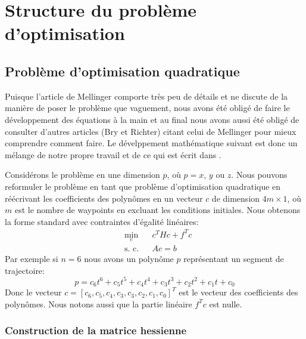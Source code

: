 \section{Structure du problème d'optimisation}

\subsection{Problème d'optimisation quadratique}

Puisque l'article de Mellinger comporte très peu de détails et ne discute de la manière de poser le problème que vaguement, nous avons été obligé de faire le développement des équations à la main et au final nous avons aussi été obligé de consulter d'autres articles (Bry et Richter) citant celui de Mellinger pour mieux comprendre comment faire. Le dévelppement mathématique suivant est donc un mélange de notre propre travail et de ce qui est écrit dans \cite{Richter2016, bry2012control}.

Considérons le problème en une dimension $p$, où $p = x$, $y$ ou $z$. Nous pouvons reformuler le problème en tant que problème d'optimisation quadratique en réécrivant les coefficients des polynômes en un vecteur $c$ de dimension $4m \times 1$, où $m$ est le nombre de waypoints en excluant les conditions initiales. Nous obtenons la forme standard avec contraintes d'égalité linéaires:
\begin{equation}\label{eq:opt_quad}
\begin{aligned}
& \underset{c}{\text{min}}
& & c^THc+f^Tc \\
& \text{s. c.}
& & Ac = b
\end{aligned}
\end{equation}
Par exemple si $n=6$ nous avons un polynôme $p$ représentant un segment de trajectoire:
\[
	p = c_6 t^6 + c_5 t^5 + c_4 t^4 + c_3 t^3 + c_2 t^2 + c_1 t + c_0
\]
Donc le vecteur $c = [c_6, c_5, c_4, c_3, c_3, c_2, c_1, c_0]^T$ est le vecteur des coefficients des polynômes. Nous notons aussi que la partie linéaire $f^Tc$ est nulle.

\subsubsection{Construction de la matrice hessienne}


